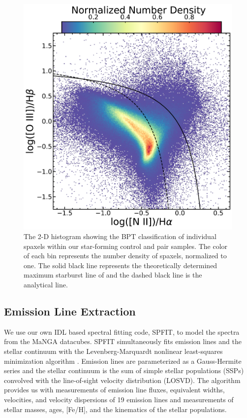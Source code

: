 \documentclass[iop,revtex4,twocolumn,apj,numberedappendix,appendixfloats]{emulateapj}
\begin{document}
\begin{figure}
\centering
\includegraphics[width=\linewidth]{fig/bpt_spax.pdf}
\caption[]{The 2-D histogram showing the BPT classification \citep{Baldwin:1981} of individual spaxels within our star-forming control and pair samples. The color of each bin represents the number density of spaxels, normalized to one. The solid black line represents the theoretically determined maximum starburst line of \citet{Kewley:2001} and the dashed black line is the analytical \citet{Kauffmann:2003} line.}
\label{fig:bpt}
\end{figure}

\subsection{Emission Line Extraction}

We use our own {\sc IDL} based spectral fitting code, {\sc SPFIT}, to model the spectra from the MaNGA datacubes. {\sc SPFIT} simultaneously fits emission lines and the stellar continuum with the Levenberg-Marquardt nonlinear least-squares minimization algorithm \citep{Fu:2018}. Emission lines are parameterized as a Gauss-Hermite series and the stellar continuum is the sum of simple stellar populations (SSPs) convolved with the line-of-sight velocity distribution (LOSVD). The algorithm provides us with measurements of emission line fluxes, equivalent widths, velocities, and velocity dispersions of 19 emission lines and measurements of stellar masses, ages, [Fe/H], and the kinematics of the stellar populations. 
\end{document}
